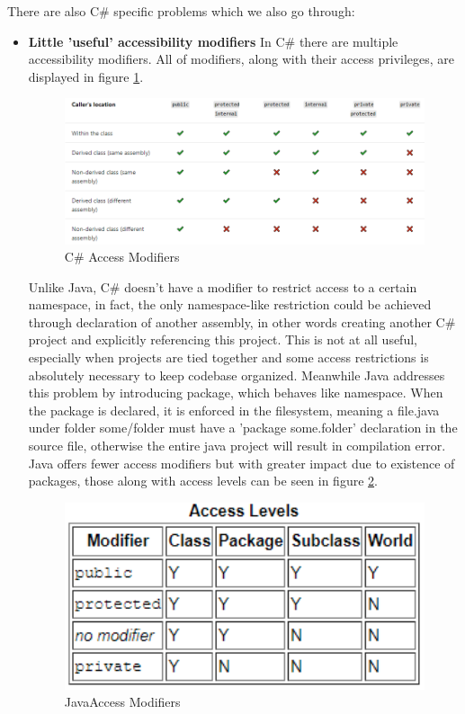 \documentclass{article}
\begin{document}
There are also C\# specific problems which we also go through:
\begin{itemize}
    \item \textbf{Little 'useful' accessibility modifiers} \newline
          In C\# there are multiple accessibility modifiers. All of modifiers, along with their access privileges, are displayed in figure \ref*{fig:accessc}.
          \begin{figure}[H]
              \centering
              \includegraphics[width=1\textwidth]{access_csharp.PNG}
              \caption{C\# Access Modifiers}
              \label{fig:accessc}
          \end{figure}
          Unlike Java, C\# doesn't have a modifier to restrict access to a certain namespace, in fact, the only namespace-like restriction could be achieved through declaration of another assembly, in other words creating another C\# project and explicitly referencing this project. This is not at all useful, especially when projects are tied together and some access restrictions is absolutely necessary to keep codebase organized.
          Meanwhile Java addresses this problem by introducing package, which behaves like namespace. When the package is declared, it is enforced in the filesystem, meaning a file.java under folder some/folder must have a 'package some.folder' declaration in the source file, otherwise the entire java project will result in compilation error.
          Java offers fewer access modifiers but with greater impact due to existence of packages, those along with access levels can be seen in figure \ref*{fig:accessjav}.
          \begin{figure}[H]
              \centering
              \includegraphics[width=1\textwidth]{access_java.PNG}
              \caption{JavaAccess Modifiers}
              \label{fig:accessjav}
          \end{figure}


\end{itemize}
\end{document}
